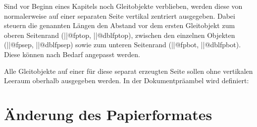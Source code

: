 \begin{Entity}{}
\begin{Declaration}
  {}
\begin{Declaration}
  {}
\begin{Declaration}
  {}
\begin{Declaration}
  {}
\begin{Declaration}
  {}
\begin{Declaration}
  {}
\printdeclarationlist[Längen]

Sind vor Beginn eines Kapitels noch Gleitobjekte verblieben, werden diese von 
 normalerweise auf einer separaten Seite vertikal zentriert 
ausgegeben. Dabei steuern die genannten Längen den Abstand vor dem ersten 
Gleitobjekt zum oberen Seitenrand (\Length||{@fptop}, \Length||{@dblfptop}), 
zwischen den einzelnen Objekten (\Length||{@fpsep}, \Length||{@dblfpsep}) sowie 
zum unteren Seitenrand (\Length||{@fpbot}, \Length||{@dblfpbot}). Diese können 
nach Bedarf angepasst werden.
\end{Declaration}
\end{Declaration}
\end{Declaration}
\end{Declaration}
\end{Declaration}
\end{Declaration}
%
\begin{Example}
Alle Gleitobjekte auf einer für diese separat erzeugten Seite sollen ohne 
vertikalen Leeraum oberhalb ausgegeben werden. In der Dokumentpräambel wird 
definiert:
\begin{Code}
\makeatletter
\setlength{\@fptop}{0pt}
\setlength{\@dblfptop}{0pt}%
\makeatother
\end{Code}
\end{Example}
\end{Entity}



\section{%
  Änderung des Papierformates%
}

